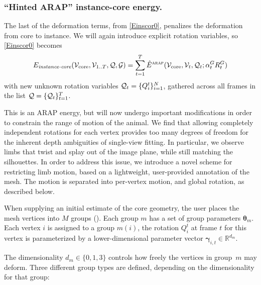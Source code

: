 \documentclass[preprint]{acmsiggraph}
\begin{document}
\subsubsection{``Hinted ARAP'' instance-core energy.} 
\label{sec:markup}
The last of the deformation terms, from \eqref{Einscor0}, penalizes the deformation from core to instance.  We will again introduce explicit rotation variables, so \eqref{Einscor0} becomes
\begin{equation}
E_{\text{\em instance-core}}(\mathcal{V}_{\text{core}},\mathcal{V}_{1..T},\mathcal{Q},\mathcal{G}) = \sum_{t=1}^T \hat{E}^\text{\sc{arap}}(\mathcal{V}_{\text{core}},\mathcal{V}_t, \mathcal{Q}_t;\alpha^G_t R^G_t)
\label{eq:Einscor}
\end{equation}
with new unknown rotation variables $\mathcal{Q}_t = \{Q_i^t\}_{i=1}^N$, gathered across all frames in the list $\mathcal{Q} = \{\mathcal{Q}_t\}_{t=1}^T$.

This is an ARAP energy, but will now undergo important modifications in order to constrain the range of motion of the animal.
We find that allowing completely independent rotations for each vertex
provides too many degrees of freedom for the inherent depth
ambiguities of single-view fitting. In
particular, we observe limbs that twist and splay out of the image
plane, while still matching the silhouettes. 
In order to address this issue, we
introduce a novel scheme for restricting limb motion, based
on a lightweight, user-provided annotation of the mesh. The motion is separated into per-vertex motion, and global rotation, as described below.

\def\grparams{\boldsymbol\theta}
\def\hintparam#1#2{\boldsymbol\gamma_{{#1,#2}}}
When supplying an initial estimate of
the core geometry, the user places the mesh vertices into $M$ groups ().  Each group $m$ has a set of group parameters $\grparams_m$.
Each vertex $i$ is assigned to a group $m(i)$,
the rotation $Q_i^t$ at frame $t$ for this vertex is parameterized by a lower-dimensional parameter vector $\hintparam it \in \mathbb R^{d_m}$.

The dimensionality $d_m \in \{0,1,3\}$ controls how freely the vertices in group~$m$ may deform.
Three different group types are defined, depending on the dimensionality for that group:
\end{document}
